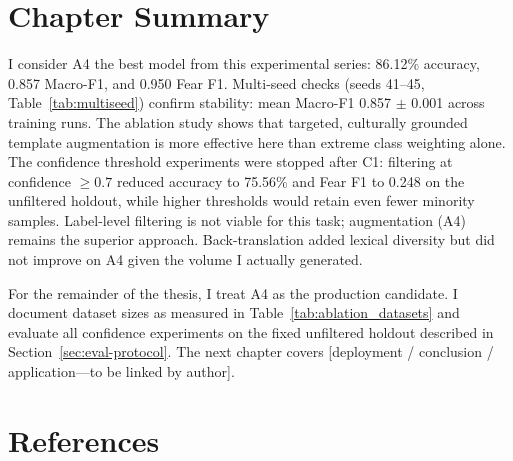 \documentclass[11pt,a4paper]{article}
\begin{document}
\section{Chapter Summary}
\label{sec:summary}

I consider A4 the best model from this experimental series: 86.12\% accuracy, 0.857 Macro-F1, and 0.950 Fear F1. Multi-seed checks (seeds 41--45, Table~\ref{tab:multiseed}) confirm stability: mean Macro-F1 0.857 $\pm$ 0.001 across training runs. The ablation study shows that targeted, culturally grounded template augmentation is more effective here than extreme class weighting alone. The confidence threshold experiments were stopped after C1: filtering at confidence $\geq 0.7$ reduced accuracy to 75.56\% and Fear F1 to 0.248 on the unfiltered holdout, while higher thresholds would retain even fewer minority samples. Label-level filtering is not viable for this task; augmentation (A4) remains the superior approach. Back-translation added lexical diversity but did not improve on A4 given the volume I actually generated.

For the remainder of the thesis, I treat A4 as the production candidate. I document dataset sizes as measured in Table~\ref{tab:ablation_datasets} and evaluate all confidence experiments on the fixed unfiltered holdout described in Section~\ref{sec:eval-protocol}. The next chapter covers [deployment / conclusion / application---to be linked by author].

\section{References}
\end{document}
